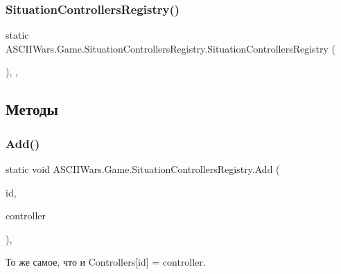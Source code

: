 \subsubsection{\texorpdfstring{Situation\+Controllers\+Registry()}{SituationControllersRegistry()}}
{\footnotesize\ttfamily static A\+S\+C\+I\+I\+Wars.\+Game.\+Situation\+Controllers\+Registry.\+Situation\+Controllers\+Registry (\begin{DoxyParamCaption}{ }\end{DoxyParamCaption})\hspace{0.3cm}{\ttfamily [inline]}, {\ttfamily [static]}, {\ttfamily [private]}}



\subsection{Методы}
\hypertarget{class_a_s_c_i_i_wars_1_1_game_1_1_situation_controllers_registry_a6b66911781c68cab75889451cd3b6644}{}\label{class_a_s_c_i_i_wars_1_1_game_1_1_situation_controllers_registry_a6b66911781c68cab75889451cd3b6644} 
\subsubsection{\texorpdfstring{Add()}{Add()}}
{\footnotesize\ttfamily static void A\+S\+C\+I\+I\+Wars.\+Game.\+Situation\+Controllers\+Registry.\+Add (\begin{DoxyParamCaption}\item[{string}]{id,  }\item[{\hyperlink{interface_a_s_c_i_i_wars_1_1_game_1_1_situation_controller}{Situation\+Controller}}]{controller }\end{DoxyParamCaption})\hspace{0.3cm}{\ttfamily [inline]}, {\ttfamily [static]}}



То же самое, что и {\ttfamily Controllers\mbox{[}id\mbox{]} = controller}. 

\hypertarget{class_a_s_c_i_i_wars_1_1_game_1_1_situation_controllers_registry_a11452e55e8852e375d27f2637ab7d743}{}\label{class_a_s_c_i_i_wars_1_1_game_1_1_situation_controllers_registry_a11452e55e8852e375d27f2637ab7d743} 
